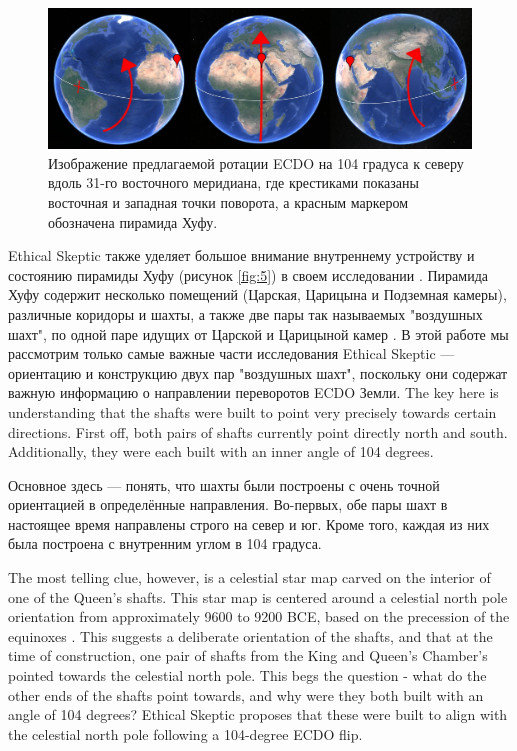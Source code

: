 \documentclass[10pt,twocolumn,letterpaper]{article}
\begin{document}
\begin{figure}[b]
\begin{center}
\includegraphics[width=1\textwidth]{drawing.jpg}
\end{center}
   \caption{Изображение предлагаемой ротации ECDO на 104 градуса к северу вдоль 31-го восточного меридиана, где крестиками показаны восточная и западная точки поворота, а красным маркером обозначена пирамида Хуфу.}
\label{fig:6}
\end{figure}

Ethical Skeptic также уделяет большое внимание внутреннему устройству и состоянию пирамиды Хуфу (рисунок \ref{fig:5}) в своем исследовании \cite{28}. Пирамида Хуфу содержит несколько помещений (Царская, Царицына и Подземная камеры), различные коридоры и шахты, а также две пары так называемых "воздушных шахт", по одной паре идущих от Царской и Царицыной камер \cite{29,30}. В этой работе мы рассмотрим только самые важные части исследования Ethical Skeptic — ориентацию и конструкцию двух пар "воздушных шахт", поскольку они содержат важную информацию о направлении переворотов ECDO Земли.
The key here is understanding that the shafts were built to point very precisely towards certain directions. First off, both pairs of shafts currently point directly north and south. Additionally, they were each built with an inner angle of 104 degrees.

Основное здесь — понять, что шахты были построены с очень точной ориентацией в определённые направления. Во-первых, обе пары шахт в настоящее время направлены строго на север и юг. Кроме того, каждая из них была построена с внутренним углом в 104 градуса.

The most telling clue, however, is a celestial star map carved on the interior of one of the Queen's shafts. This star map is centered around a celestial north pole orientation from approximately 9600 to 9200 BCE, based on the precession of the equinoxes \cite{28}. This suggests a deliberate orientation of the shafts, and that at the time of construction, one pair of shafts from the King and Queen's Chamber's pointed towards the celestial north pole. This begs the question - what do the other ends of the shafts point towards, and why were they both built with an angle of 104 degrees? Ethical Skeptic proposes that these were built to align with the celestial north pole following a 104-degree ECDO flip.
\end{document}
